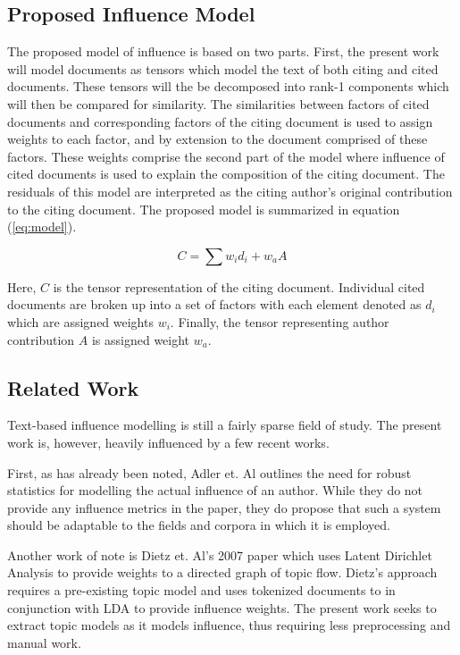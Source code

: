 \documentclass{article}
\begin{document}
\subsection{Proposed Influence Model}
The proposed model of influence is based on two parts.  First, the
present work will model documents as tensors which model the text of
both citing and cited documents. These tensors will the be decomposed
into rank-1 components which will then be compared for similarity.
The similarities between factors of cited documents and corresponding
factors of the citing document is used to assign weights to each
factor, and by extension to the document comprised of these factors.
These weights comprise the second part of the model where influence of
cited documents is used to explain the composition of the citing
document.  The residuals of this model are interpreted as the citing
author's original contribution to the citing document. The proposed
model is summarized in equation (\ref{eq:model}). 

\begin{equation}
    \label{eq:model}
    C = \sum w_id_i + w_a A
\end{equation}

Here, $C$ is the tensor representation of the citing document.
Individual cited documents are broken up into a set of factors with
each element denoted as $d_i$ which are assigned weights $w_i$.  Finally,
the tensor representing author contribution $A$ is assigned weight
$w_a$.  

\subsection{Related Work}
Text-based influence modelling is still a fairly sparse field of
study.  The present work is, however, heavily influenced by a few
recent works.

First, as has already been noted, Adler et. Al \cite{addler2009}
outlines the need for robust statistics for modelling the actual
influence of an author.  While they do not provide any influence
metrics in the paper, they do propose that such a system should be
adaptable to the fields and corpora in which it is employed.

Another work of note is Dietz et. Al's 2007 paper \cite{dietz2007} which uses
Latent Dirichlet Analysis \cite{blei2003} to provide weights to
a directed graph of topic flow.  Dietz's approach requires
a pre-existing topic model and uses tokenized documents to in
conjunction with LDA to provide influence weights.  The present work
seeks to extract topic models as it models influence, thus requiring
less preprocessing and manual work.
\end{document}
